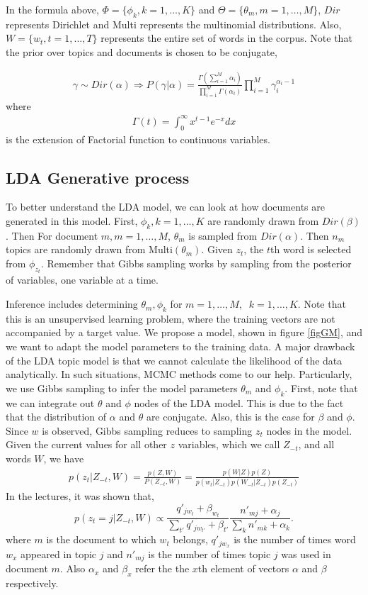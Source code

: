 \documentclass[twoside,12pt]{article}
\begin{document}
 In the formula above, $\Phi = \{\phi_k, k=1,\ldots,K\}$ and $\Theta=\{\theta_m, m=1,\ldots,M\}$, $Dir$ represents Dirichlet and Multi represents the multinomial distributions. Also, $W = \{w_t, t=1,\ldots,T\}$ represents the entire set of words in the corpus. Note that the prior over topics and documents is chosen to be conjugate,
 
\begin{align}
\gamma \sim Dir(\alpha) \Rightarrow P(\gamma | \alpha) = \frac{\Gamma(\sum_{i=1}^M \alpha_i)}{\prod_{i=1}^M \Gamma(\alpha_i)} \prod_{i=1}^M \gamma_i^{\alpha_i -1} 
\end{align}
where
\begin{align}
\Gamma(t) = \int_0^\infty x^{t-1} e^{-x} dx
\end{align}
is the extension of Factorial function to continuous variables.
\subsection{ LDA Generative process}
To better understand the LDA model, we can look at how documents are generated in this model. First, $\phi_k, k=1,\ldots,K$ are randomly drawn from $Dir(\beta)$. Then For document $m, m=1,\ldots,M$, $\theta_m$ is sampled from $Dir(\alpha)$. Then $n_m$ topics are randomly drawn from Multi$(\theta_m)$. Given $z_t$, the $t$th word is selected from $\phi_{z_t}$. Remember that Gibbs sampling works by sampling from the posterior of variables, one variable at a time. 


Inference includes determining $\theta_m, \phi_k$ for $m=1,\ldots,M,\;\; k=1,\ldots,K$. Note that this is an unsupervised learning problem, where the training vectors are not accompanied by a target value. We propose a model, shown in figure \ref{figGM}, and we want to adapt the model parameters to the training data. A major drawback of the LDA topic model is that we cannot calculate the likelihood of the data analytically. In such situations, MCMC methods come to our help. Particularly, we use Gibbs sampling to infer the model parameters $\theta_m$ and $\phi_k$. First, note that we can integrate out $\theta$ and $\phi$ nodes of the LDA model. This is due to the fact that the distribution of $\alpha$ and $\theta$ are conjugate. Also, this is the case for $\beta$ and $\phi$. Since $w$ is observed, Gibbs sampling reduces to sampling $z_t$ nodes in the model. Given the current values for all other $z$ variables, which we call $Z_{-t}$, and all words $W$, we have
\begin{align}
p(z_t|Z_{-t},W)=\frac{p(Z,W)}{P(Z_{-t},W)}=\frac{p(W|Z)p(Z)}{p(w_t|Z_{-t})p(W_{-t}|Z_{-t})p(Z_{-t})}
\end{align}
In the lectures, it was shown that,
\begin{equation}
p(z_t=j|Z_{-t},W)\propto \frac{q'_{jw_t}+\beta_{w_t}}{\sum_{t'} q'_{jw_{t'}}+\beta_{t'}}\frac{n'_{mj}+\alpha_j}{\sum_k n'_{mk}+\alpha_k}.
\end{equation}
where $m$ is the document to which $w_t$ belongs, $q'_{jw_{x}}$ is the number of times word $w_x$ appeared in topic $j$ and $n'_{mj}$ is the number of times topic $j$ was used in document $m$. Also $\alpha_x$ and $\beta_x$ refer the the $x$th element of vectors $\alpha$ and $\beta$ respectively.
\end{document}
